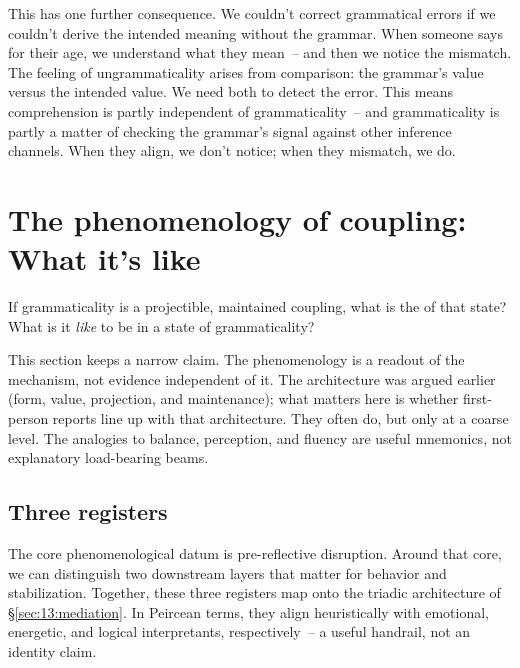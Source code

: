 This has one further consequence. We couldn't correct grammatical errors if we couldn't derive the intended meaning without the grammar. When someone says \ungram{} for their age, we understand what they mean~-- and then we notice the mismatch. The feeling of ungrammaticality arises from comparison: the grammar's value versus the intended value. We need both to detect the error. This means comprehension is partly independent of grammaticality~-- and grammaticality is partly a matter of checking the grammar's signal against other inference channels. When they align, we don't notice; when they mismatch, we do.



\section{The phenomenology of coupling: What it's like}
\label{sec:14:phenomenology}

If grammaticality is a projectible, maintained coupling, what is the  of that state? What is it \emph{like} to be in a state of grammaticality?

This section keeps a narrow claim. The phenomenology is a readout of the mechanism, not evidence independent of it. The architecture was argued earlier (form, value, projection, and maintenance); what matters here is whether first-person reports line up with that architecture. They often do, but only at a coarse level. The analogies to balance, perception, and fluency are useful mnemonics, not explanatory load-bearing beams.

\subsection{Three registers}
\label{sec:14:three-registers}

The core phenomenological datum is pre-reflective disruption. Around that core, we can distinguish two downstream layers that matter for behavior and stabilization. Together, these three registers map onto the triadic architecture of §\ref{sec:13:mediation}. In Peircean terms, they align heuristically with emotional, energetic, and logical interpretants, respectively~-- a useful handrail, not an identity claim.

